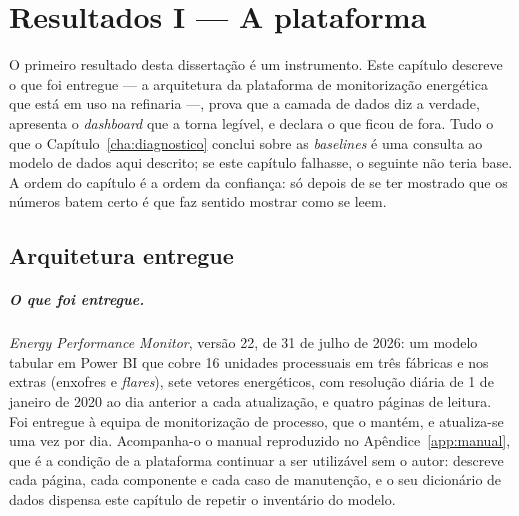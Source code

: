 
\chapter{Resultados I --- A plataforma}
\label{cha:plataforma}

O primeiro resultado desta dissertação é um instrumento. Este capítulo
descreve o que foi entregue --- a arquitetura da plataforma de
monitorização energética que está em uso na refinaria ---, prova que a
camada de dados diz a verdade, apresenta o \emph{dashboard} que a torna
legível, e declara o que ficou de fora. Tudo o que o
Capítulo~\ref{cha:diagnostico} conclui sobre as \emph{baselines} é uma
consulta ao modelo de dados aqui descrito; se este capítulo falhasse, o
seguinte não teria base. A ordem do capítulo é a ordem da confiança: só
depois de se ter mostrado que os números batem certo é que faz sentido
mostrar como se leem.

\section{Arquitetura entregue}
\label{sec:arquitetura}

\paragraph{O que foi entregue.} \emph{Energy Performance Monitor}, versão
22, de 31 de julho de 2026: um modelo tabular em Power BI que cobre 16
unidades processuais em três fábricas e nos extras (enxofres e
\emph{flares}), sete vetores energéticos, com resolução diária de 1 de
janeiro de 2020 ao dia anterior a cada atualização, e quatro páginas de
leitura. Foi entregue à equipa de monitorização de processo, que o mantém, e
atualiza-se uma vez por dia. Acompanha-o o manual reproduzido no
Apêndice~\ref{app:manual}, que é a condição de a plataforma continuar a ser
utilizável sem o autor: descreve cada página, cada componente e cada caso de
manutenção, e o seu dicionário de dados dispensa este capítulo de repetir o
inventário do modelo.

